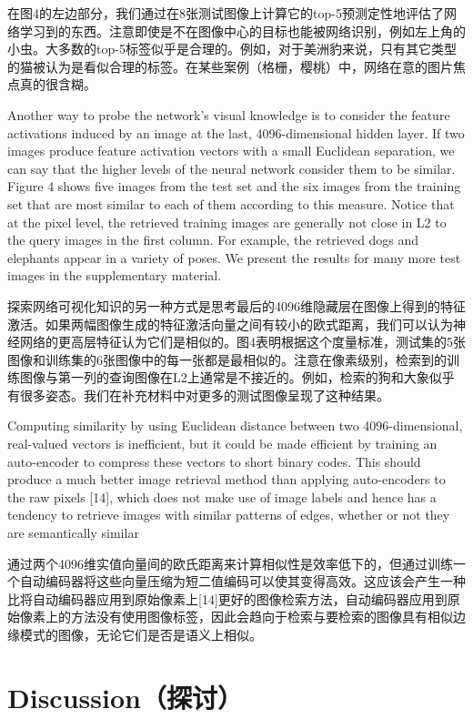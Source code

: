 \documentclass[12pt,a4paper,UTF8,twoside]{book}
\begin{document}
在图4的左边部分，我们通过在8张测试图像上计算它的top-5预测定性地评估了网络学习到的东西。注意即使是不在图像中心的目标也能被网络识别，例如左上角的小虫。大多数的top-5标签似乎是合理的。例如，对于美洲豹来说，只有其它类型的猫被认为是看似合理的标签。在某些案例（格栅，樱桃）中，网络在意的图片焦点真的很含糊。

Another way to probe the network's visual knowledge is to consider the feature activations induced by an image at the last, 4096-dimensional hidden layer. If two images produce feature activation vectors with a small Euclidean separation, we can say that the higher levels of the neural network consider them to be similar. Figure 4 shows five images from the test set and the six images from the training set that are most similar to each of them according to this measure. Notice that at the pixel level, the retrieved training images are generally not close in L2 to the query images in the first column. For example, the retrieved dogs and elephants appear in a variety of poses. We present the results for many more test images in the supplementary material.

探索网络可视化知识的另一种方式是思考最后的4096维隐藏层在图像上得到的特征激活。如果两幅图像生成的特征激活向量之间有较小的欧式距离，我们可以认为神经网络的更高层特征认为它们是相似的。图4表明根据这个度量标准，测试集的5张图像和训练集的6张图像中的每一张都是最相似的。注意在像素级别，检索到的训练图像与第一列的查询图像在L2上通常是不接近的。例如，检索的狗和大象似乎有很多姿态。我们在补充材料中对更多的测试图像呈现了这种结果。

Computing similarity by using Euclidean distance between two 4096-dimensional, real-valued vectors is inefficient, but it could be made efficient by training an auto-encoder to compress these vectors to short binary codes. This should produce a much better image retrieval method than applying auto-encoders to the raw pixels {[}14{]}, which does not make use of image labels and hence has a tendency to retrieve images with similar patterns of edges, whether or not they are semantically similar

通过两个4096维实值向量间的欧氏距离来计算相似性是效率低下的，但通过训练一个自动编码器将这些向量压缩为短二值编码可以使其变得高效。这应该会产生一种比将自动编码器应用到原始像素上{[}14{]}更好的图像检索方法，自动编码器应用到原始像素上的方法没有使用图像标签，因此会趋向于检索与要检索的图像具有相似边缘模式的图像，无论它们是否是语义上相似。

\hypertarget{discussionux63a2ux8ba8}{%
\section{Discussion（探讨）}\label{discussionux63a2ux8ba8}}
\end{document}
